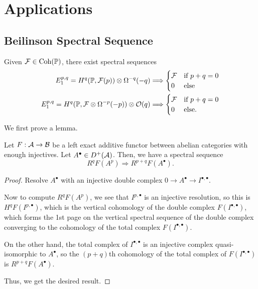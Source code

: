 \documentclass[12pt]{article}
\begin{document}
\newpage
\section{Applications}

\subsection{Beilinson Spectral Sequence}

\begin{thm}
    Given $\mathcal{F} \in \operatorname{Coh}(\mathbb{P})$, there exist spectral sequences
    \begin{align*}
        E_1^{p,q} = H^q(\mathbb{P},\mathcal{F}(p)) \otimes \Omega^{-q}(-q) & \Longrightarrow \begin{cases}
            \mathcal{F} & \text{if $p+q=0$}\\
            0 & \text{else}
        \end{cases}\\
        E_1^{p,q} = H^q(\mathbb{P},\mathcal{F} \otimes \Omega^{-p}(-p)) \otimes \mathcal{O}(q) & \Longrightarrow \begin{cases}
            \mathcal{F} & \text{if $p+q=0$}\\
            0 & \text{else.}
        \end{cases}
    \end{align*}
\end{thm}

We first prove a lemma.
\begin{lem}
    Let $F: \mathcal{A} \to \mathcal{B}$ be a left exact additive functor between abelian categories with enough injectives. Let $A^\bullet \in D^+(\mathcal{A})$. Then, we have a spectral sequence
    \[R^qF(A^p) \Longrightarrow R^{p+q}F(A^\bullet).\]
\end{lem}
\begin{proof}
    Resolve $A^\bullet$ with an injective double complex $0\to A^\bullet \to I^{\bullet,\bullet}$.

    
    Now to compute $R^q F(A^p)$, we see that $I^{p,\bullet}$ is an injective resolution, so this is $H^q F(I^{p,\bullet})$, which is the vertical cohomology of the double complex $F(I^{\bullet,\bullet})$, which forms the 1st page on the vertical spectral sequence of the double complex converging to the cohomology of the total complex $F(I^{\bullet,\bullet})$.

    On the other hand, the total complex of $I^{\bullet,\bullet}$ is an injective complex quasi-isomorphic to $A^\bullet$, so the $(p+q)$th cohomology of the total complex of $F(I^{\bullet,\bullet})$ is $R^{p+q}F(A^\bullet)$. 

    Thus, we get the desired result.
\end{proof}
\end{document}
